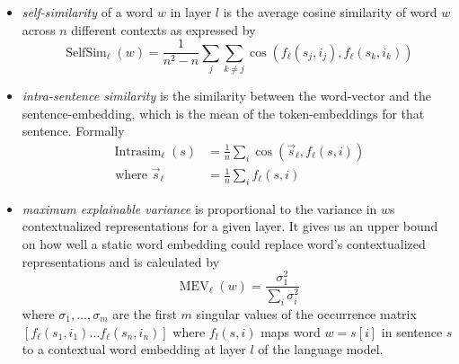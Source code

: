 \documentclass[a4paper,12pt,oneside,openright]{report}
\begin{document}
\begin{itemize}
\item \textit{self-similarity} of a word $w$ in layer $l$ is the average cosine similarity of word $w$ across $n$ different contexts as expressed by 
$$
\operatorname{SelfSim}_{\ell}(w)=\frac{1}{n^{2}-n} \sum_{j} \sum_{k \neq j} \cos \left(f_{\ell}\left(s_{j}, i_{j}\right), f_{\ell}\left(s_{k}, i_{k}\right)\right)
$$
\item \textit{intra-sentence similarity} is the similarity between the word-vector and the sentence-embedding, which is the mean of the token-embeddings for that sentence. 
Formally
$$
\begin{aligned} \operatorname{Intrasim}_{\ell}(s) &=\frac{1}{n} \sum_{i} \cos \left(\vec{s}_{\ell}, f_{\ell}(s, i)\right) \\ \text { where } \vec{s}_{\ell} &=\frac{1}{n} \sum_{i} f_{\ell}(s, i) \end{aligned}
$$
\item \textit{maximum explainable variance} is proportional to the variance in $w$s contextualized representations for a given layer.
It gives us an upper bound on how well a static word embedding could replace word's contextualized representations and is calculated by 
$$
\operatorname{MEV}_{\ell}(w)=\frac{\sigma_{1}^{2}}{\sum_{i} \sigma_{i}^{2}}
$$
where $\sigma_1, \ldots, \sigma_m$ are the first $m$ singular values of the occurrence matrix $
\left[f_{\ell}\left(s_{1}, i_{1}\right) \ldots f_{\ell}\left(s_{n}, i_{n}\right)\right]
$ where $f_l(s, i)$ maps word $w = s[i]$ in sentence $s$ to a contextual word embedding at layer $l$ of the language model.
\end{itemize}


\quad
\end{document}
